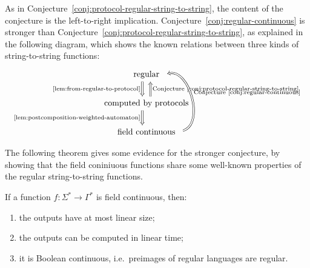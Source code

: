 As in Conjecture~\ref{conj:protocol-regular-string-to-string}, the content of the conjecture is the left-to-right implication. 
Conjecture~\ref{conj:regular-continuous} is stronger than Conjecture~\ref{conj:protocol-regular-string-to-string}, as explained in the following diagram, which shows the known relations between three kinds of string-to-string functions:
\[
\begin{tikzcd}
\text{regular}
\ar[d,Rightarrow,shift right=2, "\text{\cref{lem:from-regular-to-protocol}}"']
\\
\text{computed by protocols}
\ar[d,Rightarrow, shift right=2, "\text{\cref{lem:postcomposition-weighted-automaton}}"']
\ar[u,Rightarrow, shift right=2,"\text{Conjecture~\ref{conj:protocol-regular-string-to-string}}"']
\\ 
\text{field continuous} 
\ar[uu,bend right=89, Rightarrow, shift right=2,"\text{Conjecture~\ref{conj:regular-continuous}}"']
\end{tikzcd}
\]


The following theorem gives some evidence for the stronger conjecture, by showing that the field coniniuous functions share some well-known properties of the regular string-to-string functions. 

\begin{theorem}\label{thm:evidence-for-the-conjecture}
    If a function $f : \Sigma^* \to \Gamma^*$ is  field continuous, then:
    \begin{enumerate}
        \item \label{it:linear-size-outputs} the outputs have at most linear size;
        \item \label{it:linear-time-computable} the outputs can be   computed in linear time;
        \item \label{it:regular-preimages} it is Boolean continuous, i.e.~preimages of regular languages are regular.
    \end{enumerate}
\end{theorem}


